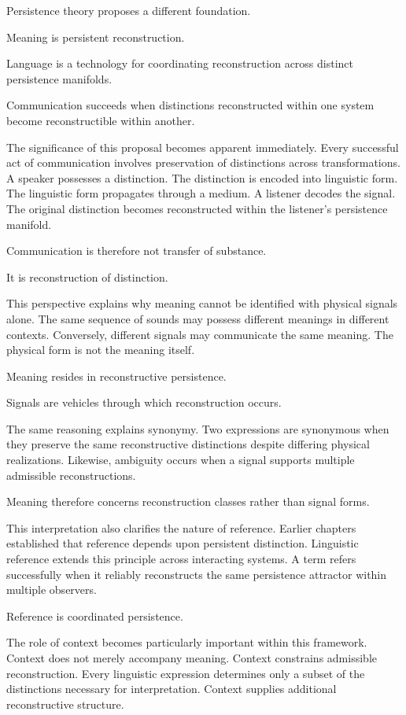 \documentclass[12pt,oneside]{article}
\theoremstyle{definition}
\begin{document}
Persistence theory proposes a different foundation.

Meaning is persistent reconstruction.

Language is a technology for coordinating reconstruction across distinct persistence manifolds.

Communication succeeds when distinctions reconstructed within one system become reconstructible within another.

The significance of this proposal becomes apparent immediately. Every successful act of communication involves preservation of distinctions across transformations. A speaker possesses a distinction. The distinction is encoded into linguistic form. The linguistic form propagates through a medium. A listener decodes the signal. The original distinction becomes reconstructed within the listener's persistence manifold.

Communication is therefore not transfer of substance.

It is reconstruction of distinction.

This perspective explains why meaning cannot be identified with physical signals alone. The same sequence of sounds may possess different meanings in different contexts. Conversely, different signals may communicate the same meaning. The physical form is not the meaning itself.

Meaning resides in reconstructive persistence.

Signals are vehicles through which reconstruction occurs.

The same reasoning explains synonymy. Two expressions are synonymous when they preserve the same reconstructive distinctions despite differing physical realizations. Likewise, ambiguity occurs when a signal supports multiple admissible reconstructions.

Meaning therefore concerns reconstruction classes rather than signal forms.

This interpretation also clarifies the nature of reference. Earlier chapters established that reference depends upon persistent distinction. Linguistic reference extends this principle across interacting systems. A term refers successfully when it reliably reconstructs the same persistence attractor within multiple observers.

Reference is coordinated persistence.

The role of context becomes particularly important within this framework. Context does not merely accompany meaning. Context constrains admissible reconstruction. Every linguistic expression determines only a subset of the distinctions necessary for interpretation. Context supplies additional reconstructive structure.
\end{document}
